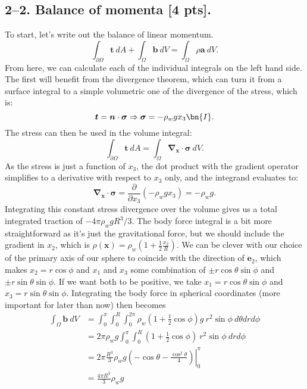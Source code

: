 \medskip
\subsection*{2--2. \textbf{Balance of momenta} [4 pts].}

To start, let's write out the balance of linear momentum.
\begin{equation*}
    \int_{\partial\Omega} \bm{t}~dA + \int_{\Omega} \bm{b} ~dV = \int_{\Omega} \rho \bm{a} ~dV.
\end{equation*}
From here, we can calculate each of the individual integrals on the left hand side. 
The first will benefit from the divergence theorem, which can turn it from a surface integral to a simple volumetric one of the divergence of the stress, which is:
\begin{equation*}
    \bm{t} = \bm{n} \cdot \bm{\sigma} \Rightarrow \bm{\sigma} = -\rho_w g x_3 \bn{I}.
\end{equation*}
The stress can then be used in the volume integral:
\begin{equation*}
    \int_{\partial\Omega} \bm{t}~dA  = \int_{\Omega} \bm{\nabla}_{\bm{x}} \cdot \bm{\sigma} ~dV.
\end{equation*}
As the stress is just a function of $x_3$, the dot product with the gradient operator simplifies to a derivative with respect to $x_3$ only, and the integrand evaluates to:
\begin{equation*}
\bm{\nabla}_{\bm{x}} \cdot \bm{\sigma} = \frac{\partial }{\partial x_3} \left( -\rho_w g x_3 \right) = -\rho_w g.
\end{equation*}
Integrating this constant stress divergence over the volume gives us a total integrated traction of $-4\pi\rho_w g R^3/3$. 
The body force integral is a bit more straightforward as it's just the gravitational force, but we should include the gradient in $x_2$, which is $\rho(\bm{x}) = \rho_w \left(1 + \frac{1}{2}\frac{x_2}{R}\right)$. 
We can be clever with our choice of the primary axis of our sphere to coincide with the direction of $\bm{e}_2$, which makes $x_2 = r\cos\phi$ and $x_1$ and $x_3$ some combination of $\pm r\cos\theta\sin\phi$ and $\pm r\sin\theta\sin\phi$. 
If we want both to be positive, we take $x_1 = r\cos\theta\sin\phi$ and $x_3 = r\sin\theta\sin\phi$. 
Integrating the body force in spherical coordinates (more important for later than now) then becomes
\begin{align*}
    \int_{\Omega} \bm{b} ~dV &= \int_0^\pi \int_0^R \int_0^{2\pi} \rho_w \left(1+\frac{1}{2}\cos\phi\right) g~r^2 \sin\phi ~d\theta dr d\phi\\
    &= 2\pi\rho_w g \int_0^\pi \int_0^R  \left(1+\frac{1}{2}\cos\phi\right)~r^2 \sin\phi ~ dr d\phi\\
    &= 2\pi \frac{R^3}{3}\rho_w g \left.\left(-\cos\theta -\frac{\cos^2\theta}{4}  \right)\right|_0^{\pi}\\
    &= \frac{4\pi R^3}{3}\rho_w g
\end{align*}
